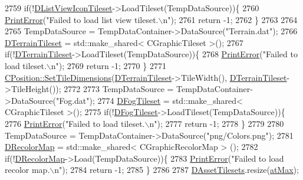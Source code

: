 \begin{DoxyCode}
2759     \textcolor{keywordflow}{if}(!\hyperlink{classCApplicationData_ab00db57ca7c624d026ed1fc108bc5b38}{DListViewIconTileset}->LoadTileset(TempDataSource))\{
2760         \hyperlink{Debug_8h_a2ed825eefefe35baf59a93a8c641323d}{PrintError}(\textcolor{stringliteral}{"Failed to load list view tileset.\(\backslash\)n"});
2761         \textcolor{keywordflow}{return} -1;
2762     \}
2763     
2764     
2765     TempDataSource = TempDataContainer->DataSource(\textcolor{stringliteral}{"Terrain.dat"});
2766     \hyperlink{classCApplicationData_acd9fb0d0ea35a6d93e8ec9212db8ef83}{DTerrainTileset} = std::make\_shared< CGraphicTileset >();
2767     \textcolor{keywordflow}{if}(!\hyperlink{classCApplicationData_acd9fb0d0ea35a6d93e8ec9212db8ef83}{DTerrainTileset}->LoadTileset(TempDataSource))\{
2768         \hyperlink{Debug_8h_a2ed825eefefe35baf59a93a8c641323d}{PrintError}(\textcolor{stringliteral}{"Failed to load tileset.\(\backslash\)n"});
2769         \textcolor{keywordflow}{return} -1;
2770     \}
2771     \hyperlink{classCPosition_a506e9efd21e209e36533ba7e594be75f}{CPosition::SetTileDimensions}(\hyperlink{classCApplicationData_acd9fb0d0ea35a6d93e8ec9212db8ef83}{DTerrainTileset}->TileWidth(), 
      \hyperlink{classCApplicationData_acd9fb0d0ea35a6d93e8ec9212db8ef83}{DTerrainTileset}->TileHeight());
2772     
2773     TempDataSource = TempDataContainer->DataSource(\textcolor{stringliteral}{"Fog.dat"});
2774     \hyperlink{classCApplicationData_a9d9103087da6592c08b8d6c669665323}{DFogTileset} = std::make\_shared< CGraphicTileset >();
2775     \textcolor{keywordflow}{if}(!\hyperlink{classCApplicationData_a9d9103087da6592c08b8d6c669665323}{DFogTileset}->LoadTileset(TempDataSource))\{
2776         \hyperlink{Debug_8h_a2ed825eefefe35baf59a93a8c641323d}{PrintError}(\textcolor{stringliteral}{"Failed to load tileset.\(\backslash\)n"});
2777         \textcolor{keywordflow}{return} -1;
2778     \}
2779     
2780     TempDataSource = TempDataContainer->DataSource(\textcolor{stringliteral}{"png/Colors.png"});
2781     \hyperlink{classCApplicationData_afcbfb5d837afd5c117d91216d1988a53}{DRecolorMap} = std::make\_shared< CGraphicRecolorMap > ();
2782     \textcolor{keywordflow}{if}(!\hyperlink{classCApplicationData_afcbfb5d837afd5c117d91216d1988a53}{DRecolorMap}->Load(TempDataSource))\{
2783         \hyperlink{Debug_8h_a2ed825eefefe35baf59a93a8c641323d}{PrintError}(\textcolor{stringliteral}{"Failed to load recolor map.\(\backslash\)n"});
2784         \textcolor{keywordflow}{return} -1;
2785     \}
2786     
2787     \hyperlink{classCApplicationData_a1aaf56a300b30c5e2484a5359366d77a}{DAssetTilesets}.resize(\hyperlink{GameDataTypes_8h_a5600d4fc433b83300308921974477feca92fbf60b4e5c335160f915b6a1c17c05}{atMax});

\end{DoxyCode}
